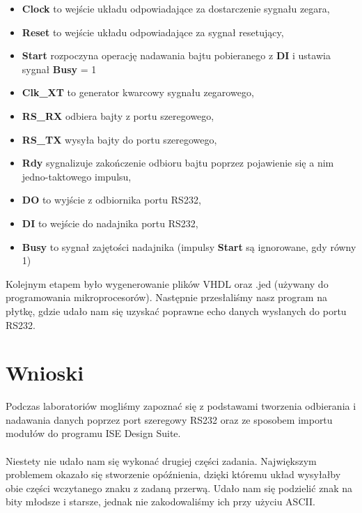 \documentclass[12pt,a4paper,titlepage]{article}
\begin{document}
\begin{itemize}
    \item \textbf{Clock} to wejście układu odpowiadające za dostarczenie sygnału zegara,
    \item \textbf{Reset} to wejście układu odpowiadające za sygnał resetujący,
    \item \textbf{Start} rozpoczyna operację nadawania bajtu pobieranego z \textbf{DI} i ustawia sygnał \textbf{Busy} = 1
    \item \textbf{Clk\_XT} to generator kwarcowy sygnału zegarowego,
    \item \textbf{RS\_RX} odbiera bajty z portu szeregowego,
    \item \textbf{RS\_TX} wysyła bajty do portu szeregowego,
    \item \textbf{Rdy} sygnalizuje zakończenie odbioru bajtu poprzez pojawienie się a nim jedno-taktowego impulsu,
    \item \textbf{DO} to wyjście z odbiornika portu RS232,
    \item \textbf{DI} to wejście do nadajnika portu RS232,
    \item \textbf{Busy} to sygnał zajętości nadajnika (impulsy \textbf{Start} są ignorowane, gdy równy 1)
\end{itemize}

Kolejnym etapem było wygenerowanie plików VHDL oraz .jed (używany do programowania mikroprocesorów). Następnie przesłaliśmy nasz program na płytkę, gdzie udało nam się uzyskać poprawne echo danych wysłanych do portu RS232.

\section{Wnioski}
Podczas laboratoriów mogliśmy zapoznać się z podstawami tworzenia odbierania i nadawania danych poprzez port szeregowy RS232 oraz ze sposobem importu modułów do programu ISE Design Suite.\\\\
Niestety nie udało nam się wykonać drugiej części zadania. Największym problemem okazało się stworzenie opóźnienia, dzięki któremu układ wysyłałby obie części wczytanego znaku z zadaną przerwą. Udało nam się podzielić znak na bity młodsze i starsze, jednak nie zakodowaliśmy ich przy użyciu ASCII.
\end{document}
